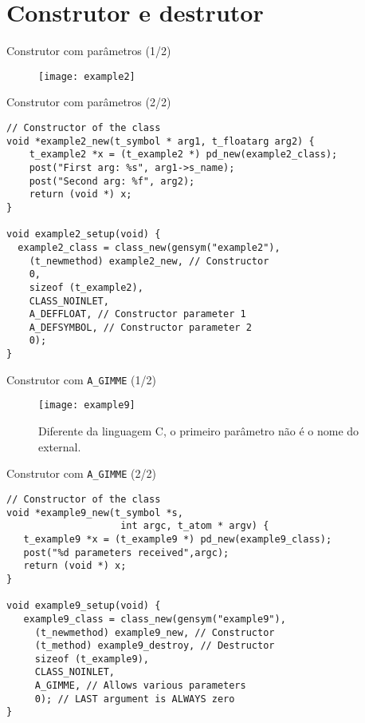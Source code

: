 \section{Construtor e destrutor}


\begin{frame}{Construtor com parâmetros (1/2)}
\begin{figure}
\centering
\texttt{[image: example2]}
\end{figure}
\end{frame}


\begin{frame}[fragile]{Construtor com parâmetros (2/2)}
\begin{lstlisting}
// Constructor of the class
void *example2_new(t_symbol * arg1, t_floatarg arg2) {
    t_example2 *x = (t_example2 *) pd_new(example2_class);
    post("First arg: %s", arg1->s_name);
    post("Second arg: %f", arg2);
    return (void *) x;
}

void example2_setup(void) {
  example2_class = class_new(gensym("example2"),
    (t_newmethod) example2_new, // Constructor
    0,
    sizeof (t_example2),
    CLASS_NOINLET,
    A_DEFFLOAT, // Constructor parameter 1
    A_DEFSYMBOL, // Constructor parameter 2
    0);
}
\end{lstlisting}
\end{frame}


\begin{frame}{Construtor com \texttt{A\_GIMME} (1/2)}
\begin{figure}[h!]
\centering
\texttt{[image: example9]}
\caption{Diferente da linguagem C, o primeiro parâmetro não é o nome do external.}
\end{figure}
\end{frame}


\begin{frame}[fragile]{Construtor com \texttt{A\_GIMME} (2/2)}
\begin{lstlisting}
// Constructor of the class
void *example9_new(t_symbol *s,
                    int argc, t_atom * argv) {
   t_example9 *x = (t_example9 *) pd_new(example9_class);
   post("%d parameters received",argc);
   return (void *) x;
}

void example9_setup(void) {
   example9_class = class_new(gensym("example9"),
     (t_newmethod) example9_new, // Constructor
     (t_method) example9_destroy, // Destructor
     sizeof (t_example9),
     CLASS_NOINLET,
     A_GIMME, // Allows various parameters
     0); // LAST argument is ALWAYS zero
}
\end{lstlisting}
\end{frame}


